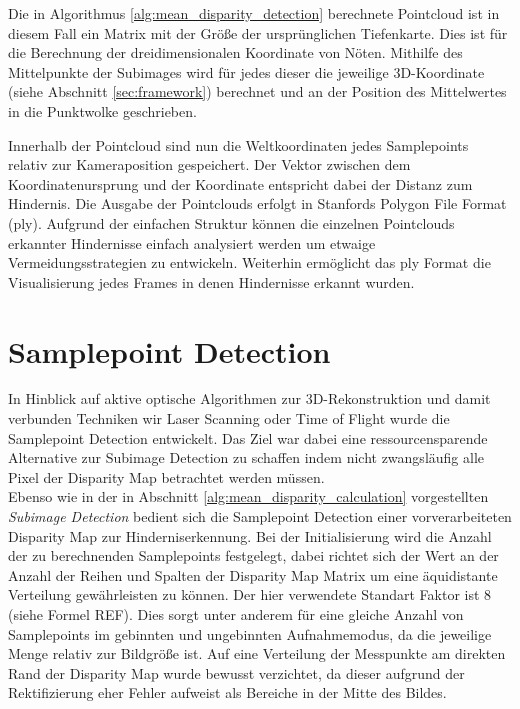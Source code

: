\noindent
Die in Algorithmus \ref{alg:mean_disparity_detection} berechnete Pointcloud ist in diesem Fall ein Matrix mit der Größe der ursprünglichen Tiefenkarte. Dies ist für die Berechnung der dreidimensionalen Koordinate von Nöten. Mithilfe des Mittelpunkte der Subimages wird für jedes dieser die jeweilige 3D-Koordinate (siehe Abschnitt \ref{sec:framework}) berechnet und an der Position des Mittelwertes in die Punktwolke geschrieben.

\noindent
Innerhalb der Pointcloud sind nun die Weltkoordinaten jedes Samplepoints relativ zur Kameraposition gespeichert. Der Vektor zwischen dem Koordinatenursprung und der Koordinate entspricht dabei der Distanz zum Hindernis. Die Ausgabe der Pointclouds erfolgt in Stanfords Polygon File Format (ply). Aufgrund der einfachen Struktur können die einzelnen Pointclouds erkannter Hindernisse einfach analysiert werden um etwaige Vermeidungsstrategien zu entwickeln. Weiterhin ermöglicht das ply Format die Visualisierung jedes Frames in denen Hindernisse erkannt wurden.

\section{Samplepoint Detection}
\label{sec:samplepoint_detection}
In Hinblick auf aktive optische Algorithmen zur 3D-Rekonstruktion und damit verbunden Techniken wir Laser Scanning oder Time of Flight wurde die Samplepoint Detection entwickelt. Das Ziel war dabei eine ressourcensparende Alternative zur Subimage Detection zu schaffen indem nicht zwangsläufig alle Pixel der Disparity Map betrachtet werden müssen.\\

\noindent
Ebenso wie in der in Abschnitt \ref{alg:mean_disparity_calculation} vorgestellten \emph{Subimage Detection} bedient sich die Samplepoint Detection einer vorverarbeiteten Disparity Map zur Hinderniserkennung. Bei der Initialisierung wird die Anzahl der zu berechnenden Samplepoints festgelegt, dabei richtet sich der Wert an der Anzahl der Reihen und Spalten der Disparity Map Matrix um eine äquidistante Verteilung gewährleisten zu können. Der hier verwendete Standart Faktor ist 8 (siehe Formel REF). Dies sorgt unter anderem für eine gleiche Anzahl von Samplepoints im gebinnten und ungebinnten Aufnahmemodus, da die jeweilige Menge relativ zur Bildgröße ist. Auf eine Verteilung der Messpunkte am direkten Rand der Disparity Map wurde bewusst verzichtet, da dieser aufgrund der Rektifizierung eher Fehler aufweist als Bereiche in der Mitte des Bildes.\\

